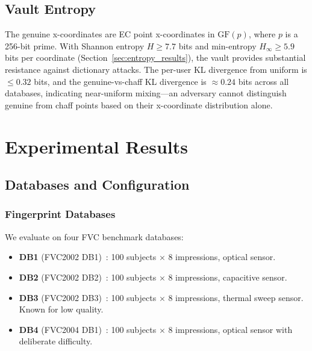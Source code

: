 \documentclass[conference]{IEEEtran}
\newcommand{\GFp}{\mathrm{GF}(p)}
\begin{document}
\subsection{Vault Entropy}
\label{sec:vault_entropy}

The genuine x-coordinates are EC point x-coordinates in $\GFp{}$, where $p$ is a 256-bit prime. With Shannon entropy $H \geq 7.7$ bits and min-entropy $H_\infty \geq 5.9$ bits per coordinate (Section~\ref{sec:entropy_results}), the vault provides substantial resistance against dictionary attacks. The per-user KL divergence from uniform is $\leq 0.32$ bits, and the genuine-vs-chaff KL divergence is $\approx 0.24$ bits across all databases, indicating near-uniform mixing---an adversary cannot distinguish genuine from chaff points based on their x-coordinate distribution alone.

\section{Experimental Results}
\label{sec:experiments}

\subsection{Databases and Configuration}
\label{sec:databases}

\subsubsection{Fingerprint Databases}
We evaluate on four FVC benchmark databases:
\begin{itemize}
    \item \textbf{DB1} (FVC2002 DB1)~\cite{maio2002fvc2002}: 100 subjects $\times$ 8 impressions, optical sensor.
    \item \textbf{DB2} (FVC2002 DB2)~\cite{maio2002fvc2002}: 100 subjects $\times$ 8 impressions, capacitive sensor.
    \item \textbf{DB3} (FVC2002 DB3)~\cite{maio2002fvc2002}: 100 subjects $\times$ 8 impressions, thermal sweep sensor. Known for low quality.
    \item \textbf{DB4} (FVC2004 DB1)~\cite{maio2004fvc2004}: 100 subjects $\times$ 8 impressions, optical sensor with deliberate difficulty.
\end{itemize}
\end{document}
